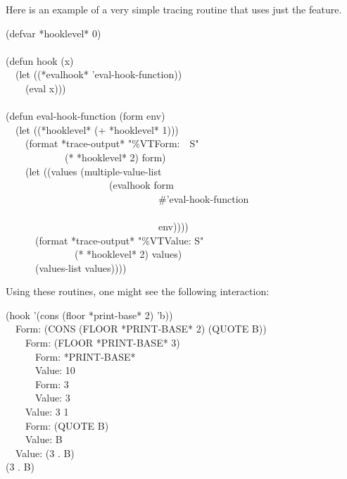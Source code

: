 \begin{defun}[Function]
Here is an example of a very simple tracing routine that uses just the
 feature.
\begin{lisp}
(defvar *hooklevel* 0) \\
 \\
(defun hook (x) \\
~~(let ((*evalhook* 'eval-hook-function)) \\
~~~~(eval x))) \\
 \\
(defun eval-hook-function (form  env) \\
~~(let ((*hooklevel* (+ *hooklevel* 1))) \\
~~~~(format *trace-output* "{\Xtilde}\%{\Xtilde}V{\Xatsign}TForm:~~{\Xtilde}S" \\
~~~~~~~~~~~~(* *hooklevel* 2) form) \\
~~~~(let ((values (multiple-value-list \\
~~~~~~~~~~~~~~~~~~~~~(evalhook form \\
~~~~~~~~~~~~~~~~~~~~~~~~~~~~~~~\#'eval-hook-function \\
~~~~~~~~~~~~~~~~~~~~~~~~~~~~~~~{\nil} \\
~~~~~~~~~~~~~~~~~~~~~~~~~~~~~~~env)))) \\
~~~~~~(format *trace-output* "{\Xtilde}\%{\Xtilde}V{\Xatsign}TValue:{\Xtilde}{\Xlbrace} {\Xtilde}S{\Xtilde}{\Xrbrace}" \\
~~~~~~~~~~~~~~(* *hooklevel* 2) values) \\
~~~~~~(values-list values))))
\end{lisp}
Using these routines, one might see the following interaction:
\begin{lisp}
(hook '(cons (floor *print-base* 2) 'b)) \\
~~Form:  (CONS (FLOOR *PRINT-BASE* 2) (QUOTE B)) \\
~~~~Form:  (FLOOR *PRINT-BASE* 3) \\
~~~~~~Form:  *PRINT-BASE* \\
~~~~~~Value: 10 \\
~~~~~~Form:  3 \\
~~~~~~Value: 3 \\
~~~~Value: 3 1 \\
~~~~Form:  (QUOTE B) \\
~~~~Value: B \\
~~Value: (3 . B) \\
(3 . B)
\end{lisp}
\end{defun}


